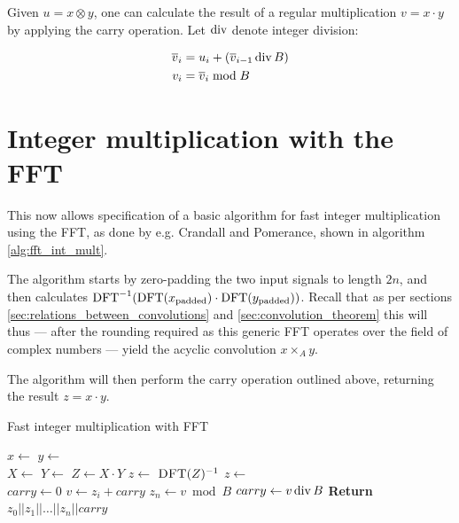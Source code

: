 Given $u = x \otimes y$, one can calculate the result of a regular
multiplication $v = x \cdot y$ by applying the carry operation. Let
$\operatorname{div}$ denote integer division:

\begin{align*}
		\overline{v}_i & = u_i + (\overline{v}_{i-1} \operatorname{div} B) \\
		v_i & = \overline{v}_i \bmod B
\end{align*}

\section{Integer multiplication with the FFT}

This now allows specification of a basic algorithm for fast integer
multiplication using the FFT, as done by e.g. Crandall and Pomerance, shown in
algorithm \ref{alg:fft_int_mult}.

The algorithm starts by zero-padding the two input signals to length $2n$, and
then calculates $\operatorname{DFT}^{-1}(\operatorname{DFT}(x_{\text{padded}}) \cdot
\operatorname{DFT}(y_{\text{padded}}))$.  Recall that as per sections
\ref{sec:relations_between_convolutions} and \ref{sec:convolution_theorem} this
will thus --- after the rounding required as this generic FFT operates over the
field of complex numbers --- yield the acyclic convolution $x \times_A y$.

The algorithm will then perform the carry operation outlined above, returning
the result $z = x \cdot y$.

\begin{algorithm}
		\caption{Fast integer multiplication with FFT}
		\begin{algorithmic}[1]
				\State $x \gets$  
				\State $y \gets$ 
				\\
				\State $X \gets$ 
				\State $Y \gets$ 
				\State $Z \gets X \cdot Y$ 
				\State $z \gets$ $\Call{DFT}{Z}^{-1}$
				\State $z \gets$ 
				\\
				\State $carry \gets 0$
				\State $v \gets z_i + carry$
				\State $z_n \gets v \bmod B$
				\State $carry \gets v \operatorname{div} B$
				\EndFor
				\State \textbf{Return} $z_0 || z_1 || \ldots || z_n || carry$
				\\
				\EndFunction
		\end{algorithmic}
		\label{alg:fft_int_mult}
\end{algorithm}
